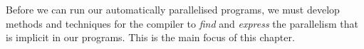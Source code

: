 Before we can run our automatically parallelised programs, we must develop
methods and techniques for the compiler to \emph{find} and \emph{express}
the parallelism that is implicit in our programs. This is the main focus
of this chapter.
